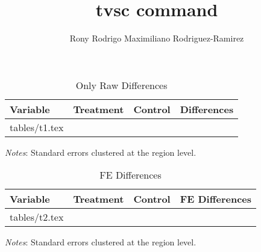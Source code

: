 \documentclass[a4paper]{article}
\makeatletter
\newcommand\primitiveinput[1]
{\@@input #1 }
\makeatother
\begin{document}
\title{tvsc command}
\author{Rony Rodrigo Maximiliano Rodriguez-Ramirez}
\date{}
\maketitle

\newpage 

\begin{table}[H]
    \singlespacing
    \small
    \centering 
    \begin{adjustbox}{max width=\textwidth}
      \begin{threeparttable}
        \caption{Only Raw Differences}
        \label{tab:table1}
        \begin{tabular}[t]{@{}lccc}
            \toprule
            Variable & Treatment & Control & Differences \\
            \midrule 
            \addlinespace
            \primitiveinput{tables/t1.tex}
            \bottomrule
        \end{tabular}
        \begin{tablenotes}
            \setlength{}
            \footnotesize
            \item \textit{Notes}: Standard errors clustered at the region level.
        \end{tablenotes}
      \end{threeparttable}
   \end{adjustbox}
 \end{table}
 \begin{table}[H]
    \singlespacing
    \small
    \centering 
    \begin{adjustbox}{max width=\textwidth}
      \begin{threeparttable}
        \caption{FE Differences}
        \label{tab:table2}
        \begin{tabular}[t]{@{}lccc}
            \toprule
            Variable & Treatment & Control & FE Differences \\
            \midrule 
            \addlinespace
            \primitiveinput{tables/t2.tex}
            \bottomrule
        \end{tabular}
        \begin{tablenotes}
            \setlength{}
            \footnotesize
            \item \textit{Notes}: Standard errors clustered at the region level.
        \end{tablenotes}
      \end{threeparttable}
   \end{adjustbox}
 \end{table}
\end{document}
